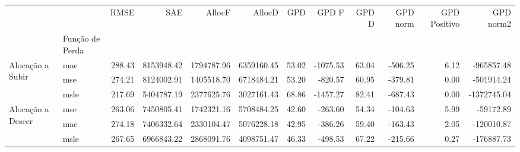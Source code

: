 \begin{tabular}{llrrrrrrrrrr}
\toprule
 &  & RMSE & SAE & AllocF & AllocD & GPD & GPD F & GPD D & GPD norm & GPD Positivo & GPD norm2 \\
 & Função de Perda &  &  &  &  &  &  &  &  &  &  \\
\midrule
\multirow[t]{3}{*}{Alocação a Subir} & mae & 288.43 & 8153948.42 & 1794787.96 & 6359160.45 & 53.02 & -1075.53 & 63.04 & -506.25 & 6.12 & -965857.48 \\
 & mse & 274.21 & 8124002.91 & 1405518.70 & 6718484.21 & 53.20 & -820.57 & 60.95 & -379.81 & 0.00 & -501914.24 \\
 & msle & 217.69 & 5404787.19 & 2377625.76 & 3027161.43 & 68.86 & -1457.27 & 82.41 & -687.43 & 0.00 & -1372745.04 \\
\cline{1-12}
\multirow[t]{3}{*}{Alocação a Descer} & mse & 263.06 & 7450805.41 & 1742321.16 & 5708484.25 & 42.60 & -263.60 & 54.34 & -104.63 & 5.99 & -59172.89 \\
 & mae & 274.18 & 7406332.64 & 2330104.47 & 5076228.18 & 42.95 & -386.26 & 59.40 & -163.43 & 2.05 & -120010.87 \\
 & msle & 267.65 & 6966843.22 & 2868091.76 & 4098751.47 & 46.33 & -498.53 & 67.22 & -215.66 & 0.27 & -176887.73 \\
\cline{1-12}
\bottomrule
\end{tabular}
